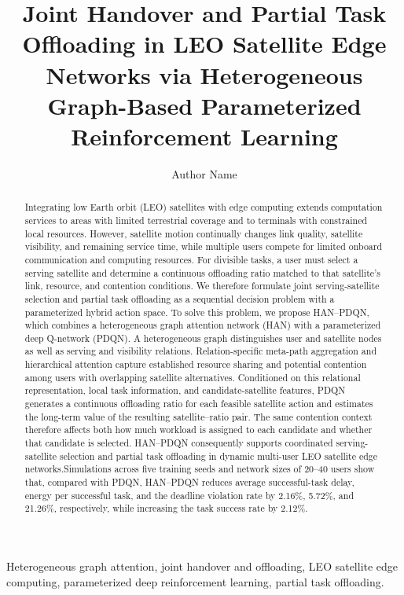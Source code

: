\documentclass[journal]{IEEEtran}
\title{Joint Handover and Partial Task Offloading in LEO Satellite Edge Networks via Heterogeneous Graph-Based Parameterized Reinforcement Learning}
\author{Author Name}
\begin{document}
\maketitle

\begin{abstract}
Integrating low Earth orbit (LEO) satellites with edge computing extends computation services to areas with limited terrestrial coverage and to terminals with constrained local resources. However, satellite motion continually changes link quality, satellite visibility, and remaining service time, while multiple users compete for limited onboard communication and computing resources. For divisible tasks, a user must select a serving satellite and determine a continuous offloading ratio matched to that satellite's link, resource, and contention conditions. We therefore formulate joint serving-satellite selection and partial task offloading as a sequential decision problem with a parameterized hybrid action space. To solve this problem, we propose HAN--PDQN, which combines a heterogeneous graph attention network (HAN) with a parameterized deep Q-network (PDQN). A heterogeneous graph distinguishes user and satellite nodes as well as serving and visibility relations. Relation-specific meta-path aggregation and hierarchical attention capture established resource sharing and potential contention among users with overlapping satellite alternatives. Conditioned on this relational representation, local task information, and candidate-satellite features, PDQN generates a continuous offloading ratio for each feasible satellite action and estimates the long-term value of the resulting satellite--ratio pair. The same contention context therefore affects both how much workload is assigned to each candidate and whether that candidate is selected. HAN--PDQN consequently supports coordinated serving-satellite selection and partial task offloading in dynamic multi-user LEO satellite edge networks.Simulations across five training seeds and network sizes of 20--40 users show that, compared with PDQN, HAN--PDQN reduces average successful-task delay, energy per successful task, and the deadline violation rate by 2.16\%, 5.72\%, and 21.26\%, respectively, while increasing the task success rate by 2.12\%.
\end{abstract}

\begin{IEEEkeywords}
Heterogeneous graph attention, joint handover and offloading, LEO satellite edge computing, parameterized deep reinforcement learning, partial task offloading.
\end{IEEEkeywords}
\end{document}
